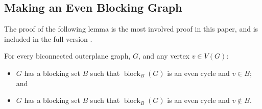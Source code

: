 \documentclass{cccg16}
\DeclareMathOperator{\block}{block}
\begin{document}
\subsection{Making an Even Blocking Graph}

The proof of the following lemma is the most involved proof in this paper,
and is included in the full version \cite{bose.dujmovic.ea:new}.

\begin{lem}
  For every biconnected outerplane graph, $G$, and any vertex $v\in V(G)$:
  \begin{itemize}
    \item $G$ has a blocking set $B$ such that $\block_B(G)$ is an even cycle 
       and $v\in B$; and
    \item $G$ has a blocking set $B$ such that $\block_B(G)$ is an even cycle 
       and $v\not\in B$.
  \end{itemize}
\end{lem}
\end{document}
